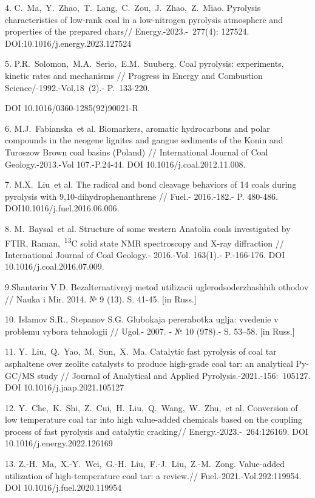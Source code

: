 4. C.~Ma,~Y.~Zhao,~T.~Lang,~C.~Zou,~J.~Zhao,~Z.~Miao. Pyrolysis
characteristics of low-rank coal in a low-nitrogen pyrolysis atmosphere
and properties of the prepared chars// Energy.-2023.-~277(4): 127524.
DOI:10.1016/j.energy.2023.127524

5. P.R.~Solomon,~M.A.~Serio,~E.M.~Suuberg. Coal pyrolysis: experiments,
kinetic rates and mechanisms // Progress in Energy and Combustion
Science/-1992.-Vol.18~(2).- P.~133-220.

DOI 10.1016/0360-1285(92)90021-R

6. M.J.~Fabianska\emph{~}et al. Biomarkers, aromatic hydrocarbons and
polar compounds in the neogene lignites and gangue sediments of the
Konin and Turoszow Brown coal basins (Poland) // International Journal
of Coal Geology.-2013.-Vol 107.-P.24-44. DOI 10.1016/j.coal.2012.11.008.

7. M.X.~Liu\emph{~}et al. The radical and bond cleavage behaviors of 14
coals during pyrolysis with 9,10-dihydrophenanthrene // Fuel.-
2016.-182.- P. 480-486. DOI10.1016/j.fuel.2016.06.006.

8. M.~Baysal\emph{~}et al. Structure of some western Anatolia coals
investigated by FTIR, Raman,~\textsuperscript{13}C solid state NMR
spectroscopy and X-ray diffraction // International Journal of Coal
Geology.- 2016.-Vol. 163(1).- P.-166-176. DOI
10.1016/j.coal.2016.07.009.

9.Shantarin V.D. Bezal\textquotesingle ternativnyj metod utilizacii
uglerodsoderzhashhih othodov // Nauka i Mir. 2014. № 9 (13). S. 41-45.
{[}in Russ.{]}

10. Islamov S.R., Stepanov S.G. Glubokaja pererabotka uglja: vvedenie v
problemu vybora tehnologii // Ugol\textquotesingle.- 2007. - № 10
(978).- S. 53--58. {[}in Russ.{]}

11. Y.~Liu,~Q.~Yao,~M.~Sun,~X.~Ma. Catalytic fast pyrolysis of coal tar
asphaltene over zeolite catalysts to produce high-grade coal tar: an
analytical Py-GC/MS study // Journal of Analytical and Applied
Pyrolysis.-2021.-156:~105127. DOI 10.1016/j.jaap.2021.105127

12. Y.~Che,~K.~Shi,~Z.~Cui,~H.~Liu,~Q.~Wang,~W.~Zhu,~et al. Conversion
of low temperature coal tar into high value-added chemicals based on the
coupling process of fast pyrolysis and catalytic cracking//
Energy.-2023.-~264:126169. DOI 10.1016/j.energy.2022.126169

13. Z.-H.~Ma,~X.-Y.~Wei,~G.-H.~Liu,~F.-J.~Liu,~Z.-M.~Zong. Value-added
utilization of high-temperature coal tar: a review.//
Fuel.-2021.-Vol.292:119954. DOI 10.1016/j.fuel.2020.119954

